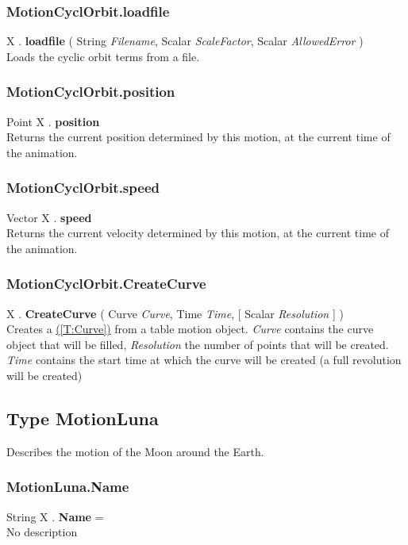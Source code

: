 \documentclass[10pt]{book}
\newcommand{\linkitem}[1]{\hyperref[#1]{\nameref{#1} (\ref{#1})}}
\newcommand{\var}[1]{\textit{#1}}
\begin{document}
\subsubsection{MotionCyclOrbit.loadfile \label{F:MotionCyclOrbit:loadfile}}
X . \textbf{loadfile} ( String \textit{Filename}, Scalar \textit{ScaleFactor}, Scalar \textit{AllowedError} ) \\
Loads the cyclic orbit terms from a file.

\subsubsection{MotionCyclOrbit.position \label{F:MotionCyclOrbit:position}}
Point X . \textbf{position} \\
Returns the current position determined by this motion, at the current time of the animation.


\subsubsection{MotionCyclOrbit.speed \label{F:MotionCyclOrbit:speed}}
Vector X . \textbf{speed} \\
Returns the current velocity determined by this motion, at the current time of the animation.


\subsubsection{MotionCyclOrbit.CreateCurve \label{F:MotionCyclOrbit:CreateCurve}}
X . \textbf{CreateCurve} ( Curve \textit{Curve}, Time \textit{Time},  [ Scalar \textit{Resolution} ] ) \\
Creates a \linkitem{T:Curve} from a table motion object. \var{Curve} contains the curve object that will be filled, \var{Resolution} the number of points that will be created. \var{Time} contains the start time at which the curve will be created (a full revolution will be created)



\subsection{Type MotionLuna \label{T:MotionLuna}}
Describes the motion of the Moon around the Earth.

\subsubsection{MotionLuna.Name \label{F:MotionLuna:Name}}
String X . \textbf{Name} = \\
No description
\end{document}
